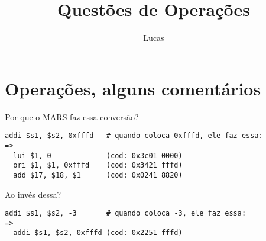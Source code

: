 \documentclass{article}
\author{Lucas}
\title{Questões de Operações}
\begin{document}
\maketitle

\section{Operações, alguns comentários}

Por que o MARS faz essa conversão?
\begin{verbatim}
addi $s1, $s2, 0xfffd   # quando coloca 0xfffd, ele faz essa:
=>
  lui $1, 0             (cod: 0x3c01 0000)
  ori $1, $1, 0xfffd    (cod: 0x3421 fffd)
  add $17, $18, $1      (cod: 0x0241 8820)
\end{verbatim}
Ao invés dessa?
\begin{verbatim}
addi $s1, $s2, -3       # quando coloca -3, ele faz essa:
=>
  addi $s1, $s2, 0xfffd (cod: 0x2251 fffd)
\end{verbatim}
\end{document}
